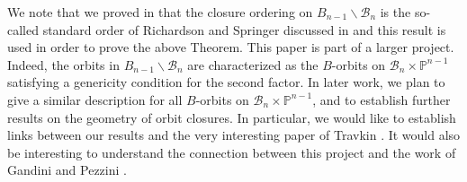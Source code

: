 \documentclass[12pt]{amsart}
\numberwithin{equation}{section}
\newcommand{\fk}{\mbox{${\mathfrak k}$}}
\newcommand{\fg}{\mbox{${\mathfrak g}$}}
\newcommand{\B}{\mathcal{B}}
\newcommand{\ms}{m(s_{\alpha})}
\newcommand{\Borbitspace}{B_{n-1}\backslash\B_{n}}
\begin{document}
We note that we proved in \cite{CE21II} that the closure ordering on $\Borbitspace$ is the so-called standard order of Richardson and Springer discussed in \cite{RS} and this result is used in order to prove the above Theorem.  This paper is part of a larger project.  Indeed, the orbits in $\Borbitspace$ are characterized as the $B$-orbits on $\B_n \times \mathbb{P}^{n-1}$ satisfying a genericity condition for the second factor.  In later work, we plan to give a similar description for all $B$-orbits on $\B_n \times \mathbb{P}^{n-1}$, and to establish further results on the geometry of orbit closures.   In particular, we would like to establish links between our results and the very interesting paper of Travkin \cite{Tr}.  It would also be interesting to understand the connection between this project and the work of Gandini and Pezzini \cite{GP}.  




 
\end{document}
